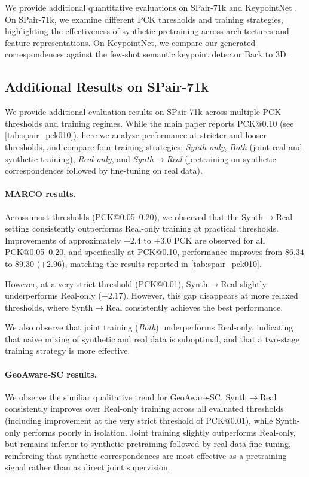 We provide additional quantitative evaluations on SPair-71k \cite{min2019spair71k}
and KeypointNet \cite{you2020}. On SPair-71k, we examine different PCK
thresholds and training strategies, highlighting the
effectiveness of synthetic pretraining across architectures
and feature representations. On KeypointNet, we compare
our generated correspondences against the few-shot
semantic keypoint detector Back to 3D.

\subsection{Additional Results on SPair-71k}
\label{sup:supp_spair}
We provide additional evaluation results on SPair-71k \cite{min2019spair71k} across multiple PCK thresholds and training regimes. While the main paper reports PCK@0.10 (see \autoref{tab:spair_pck010}), here we analyze performance at stricter and looser thresholds, and compare four training strategies: \emph{Synth-only}, \emph{Both} (joint real and synthetic training), \emph{Real-only}, and \emph{Synth$\rightarrow$Real} (pretraining on synthetic correspondences followed by fine-tuning on real data).

\paragraph{MARCO \cite{cuttano2026marco} results.}
Across most thresholds (PCK@0.05--0.20), we observed that the Synth$\rightarrow$Real setting consistently outperforms Real-only training at practical thresholds. Improvements of approximately $+2.4$ to $+3.0$ PCK are observed for all PCK@0.05--0.20, and specifically at PCK@0.10, performance improves from $86.34$ to $89.30$ ($+2.96$), matching the results reported in \autoref{tab:spair_pck010}.

However, at a very strict threshold (PCK@0.01), Synth$\rightarrow$Real slightly underperforms Real-only ($-2.17$). However, this gap disappears at more relaxed thresholds, where Synth$\rightarrow$Real consistently achieves the best performance.

We also observe that joint training (\emph{Both}) underperforms Real-only, indicating that naive mixing of synthetic and real data is suboptimal, and that a two-stage training strategy is more effective.

\paragraph{GeoAware-SC \cite{zhang2024tellingLeftFromRight} results.}
We observe the similiar qualitative trend for GeoAware-SC. Synth$\rightarrow$Real consistently improves over Real-only training across all evaluated thresholds (including improvement at the very strict threshold of PCK@0.01), while Synth-only performs poorly in isolation. Joint training slightly outperforms Real-only, but remains inferior to synthetic pretraining followed by real-data fine-tuning, reinforcing that synthetic correspondences are most effective as a pretraining signal rather than as direct joint supervision.

